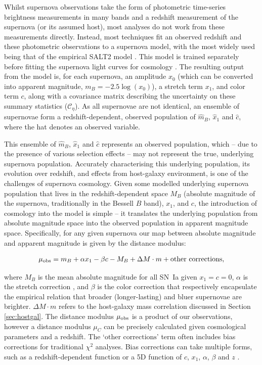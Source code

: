 \documentclass[a4paper,fleqn,usenatbib]{emulateapj}
\begin{document}
Whilst supernova observations take the form of photometric time-series brightness measurements in many bands and a redshift measurement of the supernova (or its assumed host), most analyses do not work from these measurements directly. Instead, most techniques fit an observed redshift and these photometric observations to a supernova model, with the most widely used being that of the empirical SALT2 model \citep{Guy2007, Guy2010}. This model is trained separately before fitting the supernova light curves for cosmology \citep{Guy2010, Betoule2014}. The resulting output from the model is, for each supernova, an amplitude $x_0$ (which can be converted into apparent magnitude, $m_B = -2.5\log(x_0)$), a stretch term $x_1$, and color term $c$, along with a covariance matrix describing the uncertainty on these summary statistics ($\mathcal{C_\eta}$). As all supernovae are not identical, an ensemble of supernovae form a redshift-dependent, observed population of $\hat{m}_B$, $\hat{x}_1$ and $\hat{c}$, where the hat denotes an observed variable.

This ensemble of $\hat{m}_B$, $\hat{x}_1$ and $\hat{c}$ represents an observed population, which -- due to the presence of various selection effects -- may not represent the true, underlying supernova population. Accurately characterising this underlying population, its evolution over redshift, and effects from host-galaxy environment, is one of the challenges of supernova cosmology. Given some modelled underlying supernova population that lives in the redshift-dependent space $M_B$ (absolute magnitude of the supernova, traditionally in the Bessell $B$ band), $x_1$, and $c$, the introduction of cosmology into the model is simple -- it translates the underlying population from absolute magnitude space into the observed population in apparent magnitude space. Specifically, for any given supernova our map between absolute magnitude and apparent magnitude is given by the distance modulus:

\begin{align}
\mu_{\rm obs} = m_B + \alpha x_1 - \beta c - M_B + \Delta M \cdot m + \text{other corrections}, \label{eq:standard}
\end{align}

where $M_B$ is the mean absolute magnitude for all SN~Ia given $x_1=c=0$,  $\alpha$ is the stretch correction \citep{Phillips1993, Phillips1999}, and $\beta$ is the color correction \citep{Tripp1998} that respectively encapsulate the empirical relation that broader (longer-lasting) and bluer supernovae are brighter. $\Delta M \cdot m$ refers to the host-galaxy mass correlation discussed in Section \ref{sec:hostgal}. The distance modulus $\mu_{\rm obs}$ is a product of our observations, however a distance modulus $\mu_C$ can be precisely calculated given cosmological parameters and a redshift. The `$\text{other corrections}$' term often includes bias corrections for traditional $\chi^2$ analyses. Bias corrections can take multiple forms, such as a redshift-dependent function \citep{Betoule2014} or a 5D function of $c$, $x_1$, $\alpha$, $\beta$ and $z$ \citep{Kessler2017, Scolnic2017}.
\end{document}
